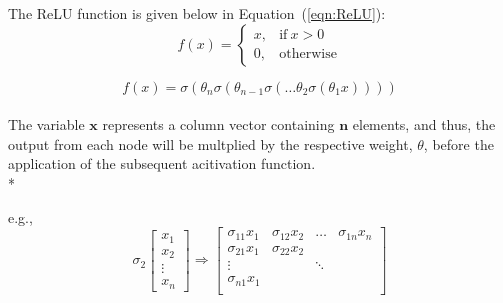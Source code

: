 The ReLU function is given below in Equation~(\ref{eqn:ReLU}):
\begin{equation}
	f(x) =
	\begin{cases}
		x, & \text{if}\ x > 0 \\
		0, & \text{otherwise}
	\end{cases}
	\label{eqn:ReLU}
\end{equation}

\begin{equation}
	f(x) = \sigma(\theta_n \sigma(\theta_{n-1} \sigma(\ldots \theta_2 \sigma(\theta_1 x))))
\end{equation}
\\
The variable $\boldsymbol x$ represents a column vector containing $\boldsymbol n$ elements, and thus, the output from each node will be multplied by the respective weight, $\theta$, before the application of the subsequent acitivation function. \\*

e.g.,
\begin{equation}
	\sigma_2 \begin{bmatrix}
				x_{1} \\
				x_{2} \\
				\vdots \\
				x_{n}
			\end{bmatrix}
	\Rightarrow \begin{bmatrix}
					\sigma_{11} x_{1} & \sigma_{12} x_{2} & \ldots & \sigma_{1n} x_{n} \\
					\sigma_{21} x_{1} & \sigma_{22} x_2 \\
					\vdots & & \ddots \\
					\sigma_{n1} x_{1} \\
				\end{bmatrix}
\end{equation}


